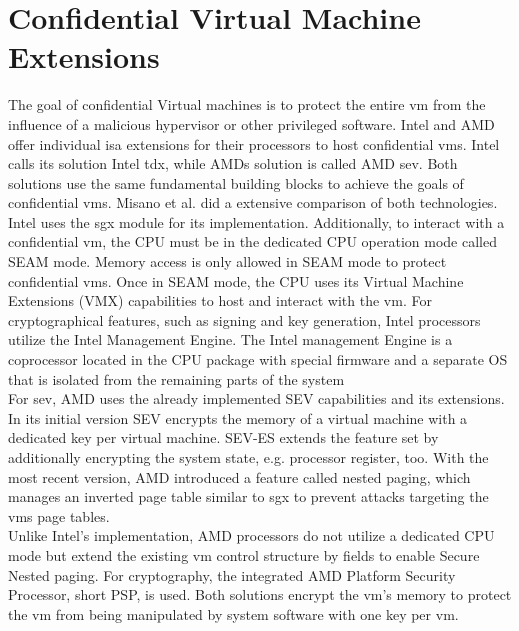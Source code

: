 \section{Confidential Virtual Machine Extensions}
\label{section:20:confidential_vms}
The goal of confidential Virtual machines is to protect the entire \gls{vm} from
the influence of a malicious hypervisor or other privileged software. Intel and
AMD offer individual \gls{isa} extensions for their processors to host
confidential \glspl{vm}. Intel calls its solution Intel \gls{tdx}, while AMDs
solution is called AMD \gls{sev}.\cite{tdx_whitepaper,kaplan_amd_2020} Both
solutions use the same fundamental building blocks to achieve the goals of
confidential \glspl{vm}. Misano et al. did a extensive comparison of both
technologies.\cite{misono_confidential_2024} Intel uses the \gls{sgx} module for
its implementation. Additionally, to interact with a confidential \gls{vm}, the
CPU must be in the dedicated CPU operation mode called SEAM mode. Memory access
is only allowed in SEAM mode to protect confidential \glspl{vm}. Once in SEAM
mode, the CPU uses its Virtual Machine Extensions (VMX) capabilities to host and
interact with the \gls{vm}. For cryptographical features, such as signing and
key generation, Intel processors utilize the Intel Management Engine. The Intel
management Engine is a coprocessor located in the CPU package with special
firmware and a separate OS that is isolated from the remaining parts of the
system\\

For \gls{sev}, AMD uses the already implemented SEV capabilities and its
extensions. In its initial version SEV encrypts the memory of a virtual machine
with a dedicated key per virtual machine. SEV-ES extends the feature set by
additionally encrypting the system state, e.g. processor register, too. With the
most recent version, AMD introduced a feature called nested paging, which
manages an inverted page table similar to \gls{sgx} to prevent attacks targeting
the \gls{vm}s page tables.\\

Unlike Intel's implementation, AMD processors do not utilize a dedicated CPU
mode but extend the existing \gls{vm} control structure by fields to enable
Secure Nested paging. For cryptography, the integrated AMD Platform Security
Processor, short PSP, is used. Both solutions encrypt the \gls{vm}'s memory to
protect the \gls{vm} from being manipulated by system software with one key per
\gls{vm}.\\

